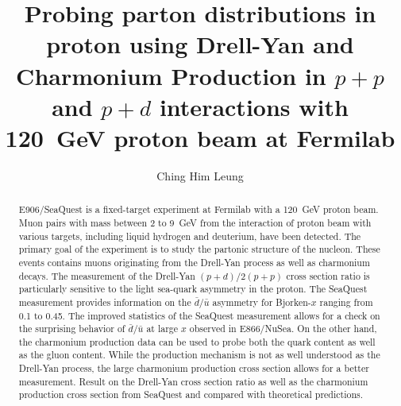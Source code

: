 \documentclass[final]{uiucthesis2021}
\begin{document}
\title{Probing parton distributions in proton using Drell-Yan and Charmonium Production
	in $p+p$ and $p+d$ interactions with \SI{120}{\GeV} proton beam at Fermilab}
\author{Ching Him Leung}

\phdthesis
{}
\maketitle
\frontmatter

\begin{abstract}
	E906/SeaQuest is a fixed-target experiment at Fermilab with a \SI{120}{\GeV}
	proton beam. Muon pairs with mass between \num{2} to \SI{9}{\GeV} from the
	interaction of proton beam with various targets, including liquid hydrogen and
	deuterium, have been detected.
	The primary goal of the experiment is to study the partonic structure of the nucleon.
	These events contains muons originating from the Drell-Yan process as well as
	charmonium decays. The measurement of the Drell-Yan $(p+d)/2(p+p)$ cross section
	ratio is particularly sensitive to the light sea-quark asymmetry in the proton.
	The SeaQuest measurement provides information on the $\bar{d}/\bar{u}$ asymmetry
	for  Bjorken-$x$ ranging from \num{0.1} to \num{0.45}. The improved statistics
	of the SeaQuest measurement allows for a check on the surprising behavior of
	$\bar{d}/\bar{u}$ at large $x$ observed in E866/NuSea.
	On the other hand, the charmonium production data can be used to probe both the quark
	content as well as the gluon content. While the production mechanism is not as well
	understood as the Drell-Yan process, the large charmonium production cross section
	allows for a better measurement.
	Result on the Drell-Yan cross section ratio	as well as the charmonium production cross
	section from SeaQuest and compared with theoretical predictions.

\end{abstract}


\ifoptionfinal{
	
}{}

{
	\hypersetup{linkcolor=black}  %
	\tableofcontents
	\listoffigures
}
\end{document}
